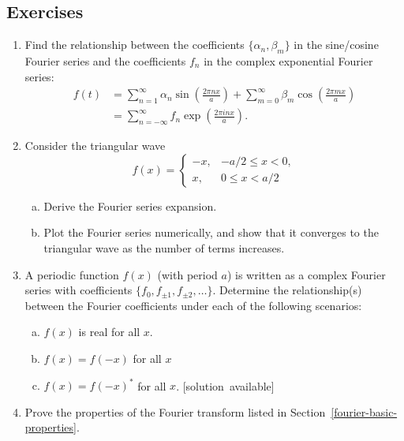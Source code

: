 \documentclass[10pt,a4paper]{article}
\begin{document}
\subsection{Exercises}\label{exercises}

\begin{enumerate}
\item
  Find the relationship between the coefficients
  $\{\alpha_n, \beta_m\}$ in the sine/cosine Fourier series and the
  coefficients $f_n$ in the complex exponential Fourier
  series:
  \begin{align}
    f(t) &= \sum_{n=1}^\infty \alpha_n \sin\left(\frac{2\pi n x}{a}\right) + \sum_{m=0}^\infty \beta_m \cos\left(\frac{2 \pi m x}{a}\right) \\
    &= \sum_{n=-\infty}^\infty f_n \exp\left(\frac{2\pi i n x}{a}\right).
  \end{align}

\item
  Consider the triangular wave
  \begin{equation}
    f(x) = \left\{\begin{array}{rr}- x, &-a/2 \le x < 0, \\
    x, & 0 \le x < a/2\end{array}\right.
  \end{equation}

  \begin{enumerate}[(a)]
  \item
    Derive the Fourier series expansion.

  \item
    Plot the Fourier series numerically, and show that it converges to
    the triangular wave as the number of terms increases.
  \end{enumerate}

\item
  A periodic function $f(x)$ (with period $a$) is written as a complex
  Fourier series with coefficients $\{f_0, f_{\pm1}, f_{\pm2},
  \dots\}$. Determine the relationship(s) between the Fourier
  coefficients under each of the following scenarios:
  \begin{enumerate}[(a)]
  \item $f(x)$ is real for all $x$.
  \item $f(x) = f(-x)$ for all $x$
  \item $f(x) = f(-x)^*$ for all $x$.
  \hfill{\scriptsize [solution~available]}
  \end{enumerate}

\item
  Prove the properties of the Fourier transform listed in
  Section~\ref{fourier-basic-properties}.


\end{enumerate}
\end{document}
